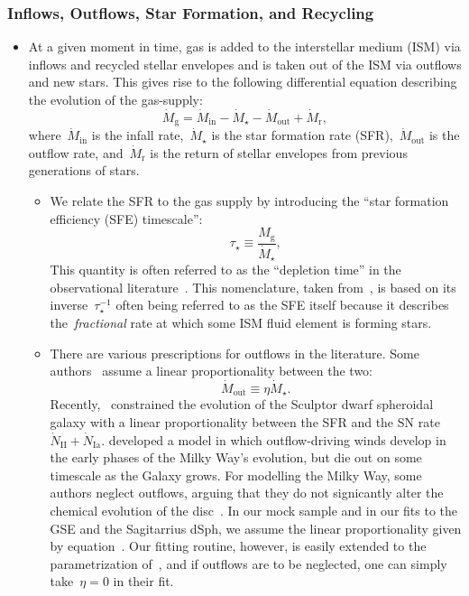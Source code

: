 \documentclass[ms.tex]{subfiles}
\begin{document}
\subsubsection{Inflows, Outflows, Star Formation, and Recycling}
\label{sec:methods:onezone:gas}

\begin{itemize}

	\item At a given moment in time, gas is added to the interstellar medium
	(ISM) via inflows and recycled stellar envelopes and is taken out of the
	ISM via outflows and new stars.
	This gives rise to the following differential equation describing the
	evolution of the gas-supply:
	\begin{equation}
	\label{eq:mdot_gas}
	\dot{M}_\text{g} = \dot{M}_\text{in} - \dot{M}_\star - \dot{M}_\text{out}
	+ \dot{M}_\text{r},
	\end{equation}
	where~$\dot{M}_\text{in}$ is the infall rate,~$\dot{M}_\star$ is the star
	formation rate (SFR),~$\dot{M}_\text{out}$ is the outflow rate,
	and~$\dot{M}_\text{r}$ is the return of stellar envelopes from previous
	generations of stars.

	\begin{itemize}
		\item We relate the SFR to the gas supply by introducing the ``star
		formation efficiency (SFE) timescale'':
		\begin{equation}
		\tau_\star \equiv \frac{M_\text{g}}{\dot{M}_\star},
		\end{equation}
		This quantity is often referred to as the ``depletion time'' in the
		observational literature~\citep[e.g.][]{Tacconi2018}.
		This nomenclature, taken from~\citet{Weinberg2017}, is based on its
		inverse~$\tau_\star^{-1}$ often being referred to as the SFE itself
		because it describes the~\textit{fractional} rate at which some ISM
		fluid element is forming stars.

		\item There are various prescriptions for outflows in the literature.
		Some authors~\citep[e.g.][]{Andrews2017, Weinberg2017} assume a linear
		proportionality between the two:
		\begin{equation}
		\label{eq:eta}
		\dot{M}_\text{out} \equiv \eta\dot{M}_\star.
		\end{equation}
		Recently,~\citet{delosReyes2022} constrained the evolution of the
		Sculptor dwarf spheroidal galaxy with a linear proportionality between
		the SFR and the SN rate~$\dot{N}_\text{II} + \dot{N}_\text{Ia}$.
		\citet*{Kobayashi2020} developed a model in which outflow-driving winds
		develop in the early phases of the Milky Way's evolution, but die out
		on some timescale as the Galaxy grows.
		For modelling the Milky Way, some authors neglect outflows, arguing
		that they do not signicantly alter the chemical evolution of the
		disc~\citep[e.g.][]{Spitoni2019, Spitoni2021}.
		In our mock sample and in our fits to the GSE and the Sagitarrius dSph,
		we assume the linear proportionality given by equation~.
		Our fitting routine, however, is easily extended to the parametrization
		of~\citet{delosReyes2022}, and if outflows are to be neglected, one can
		simply take~$\eta = 0$ in their fit.


\end{itemize}
\end{itemize}
\end{document}
